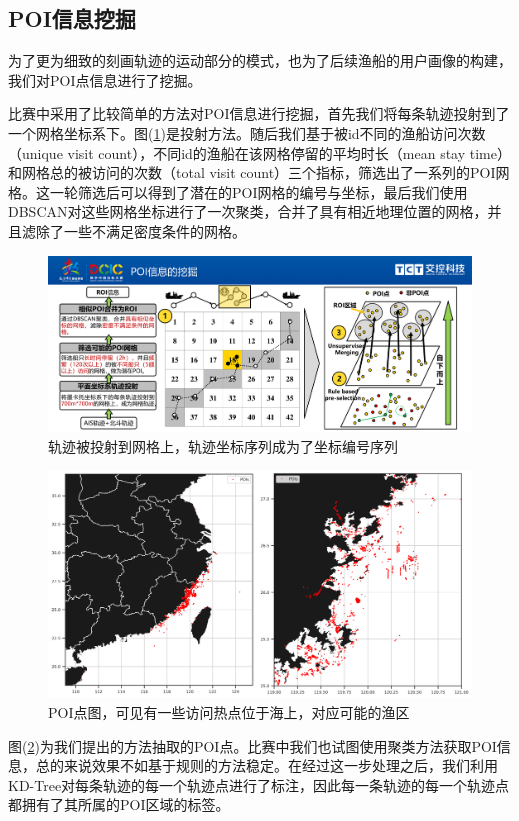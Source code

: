 \documentclass[UTF8, 12pt]{ctexart}
\begin{document}
		\subsection{POI信息挖掘}
		为了更为细致的刻画轨迹的运动部分的模式，也为了后续渔船的用户画像的构建，我们对POI点信息进行了挖掘。

		比赛中采用了比较简单的方法对POI信息进行挖掘，首先我们将每条轨迹投射到了一个网格坐标系下。图(\ref{sec_2_grid_compression})是投射方法。随后我们基于被id不同的渔船访问次数（unique visit count），不同id的渔船在该网格停留的平均时长（mean stay time）和网格总的被访问的次数（total visit count）三个指标，筛选出了一系列的POI网格。这一轮筛选后可以得到了潜在的POI网格的编号与坐标，最后我们使用DBSCAN对这些网格坐标进行了一次聚类，合并了具有相近地理位置的网格，并且滤除了一些不满足密度条件的网格。	
		\begin{figure}[H]
			\centering
			\includegraphics[width=0.75\linewidth]{..//plots//poi_mining_method.pdf}
			\caption{轨迹被投射到网格上，轨迹坐标序列成为了坐标编号序列}
			\label{sec_2_grid_compression}
			\vspace{-0.2cm}
		\end{figure}

		\begin{figure}[H]
			\centering
			\includegraphics[width=0.75\linewidth]{..//plots//feature_pois.png}
			\caption{POI点图，可见有一些访问热点位于海上，对应可能的渔区}
			\label{sec_2_fig_1}
			\vspace{-0.2cm}
		\end{figure}
		图(\ref{sec_2_fig_1})为我们提出的方法抽取的POI点。比赛中我们也试图使用聚类方法\cite{Palma2008A}获取POI信息，总的来说效果不如基于规则的方法稳定。在经过这一步处理之后，我们利用KD-Tree对每条轨迹的每一个轨迹点进行了标注，因此每一条轨迹的每一个轨迹点都拥有了其所属的POI区域的标签。
\end{document}
